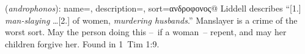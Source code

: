 \item[Husband-murderer,]

(\textit{androphonos}):
{
    name=,
    description={},
    sort=ανδροφονος@
}
Liddell describes ``[1.] \emph{man-slaying} \ldots [2.] of women, \emph{murdering husbands}.'' Manslayer is a crime of the worst sort. May the person doing this --~if a woman~-- repent, and may her children forgive her.
Found in 1~Tim 1:9.

